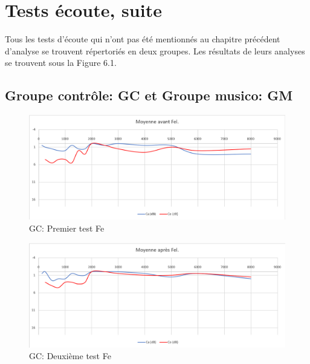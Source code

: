 \section{Tests écoute, suite }

Tous les  tests d'écoute qui n'ont pas été mentionnés au chapitre précédent d'analyse  se trouvent 
répertoriés
en deux groupes. Les résultats de leurs analyses se trouvent sous la Figure  6.1.
 \subsection*{Groupe contrôle: GC  et Groupe musico: GM}
 
  \begin{figure}[th]
 	\centering
 	\includegraphics[width=1\linewidth]{images/graphiques/moyavFEL.png}
 	\caption[GC: Patient Fe: 1° test]{GC: Premier test Fe}
 	\label{fig:moyavfel}
 \end{figure}
 \begin{figure}[th]
 	\centering
 	\includegraphics[width=1\linewidth]{images/graphiques/moyaprFEL.png}
 	\caption[GC: Patient Fe: 2° test]{GC: Deuxième test Fe}
 	\label{fig:moyavfel}
 \end{figure}
 
 \clearpage
 
